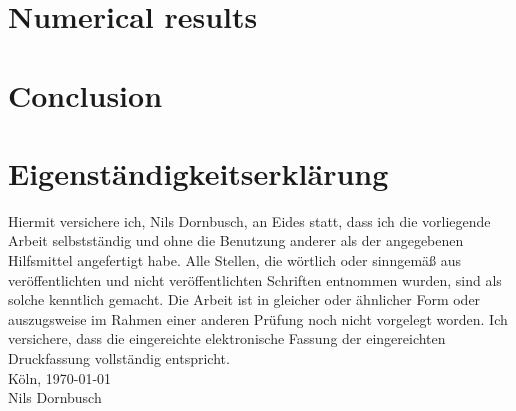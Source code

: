 \documentclass[12pt,a4paper]{scrartcl}
\numberwithin{equation}{section} %
\theoremstyle{definition}
\theoremstyle{plain}
\begin{document}
\section{Numerical results}
\section{Conclusion}

\setcounter{lofdepth}{2}
\listoffigures
\newpage
{}

{}
\newpage
\section*{Eigenständigkeitserklärung}
Hiermit versichere ich, Nils Dornbusch, an Eides statt, dass ich die vorliegende Arbeit selbstständig und ohne die Benutzung anderer als der angegebenen Hilfsmittel angefertigt habe. Alle Stellen, die wörtlich oder sinngemäß aus veröffentlichten und nicht veröffentlichten Schriften entnommen wurden, sind als solche kenntlich gemacht. Die Arbeit ist in gleicher oder ähnlicher Form oder auszugsweise im Rahmen einer anderen Prüfung noch nicht vorgelegt worden. Ich versichere, dass die eingereichte elektronische Fassung der eingereichten Druckfassung vollständig entspricht.
\\[\bigskipamount]
Köln, \today
\\[2\bigskipamount]
Nils Dornbusch
\end{document}
